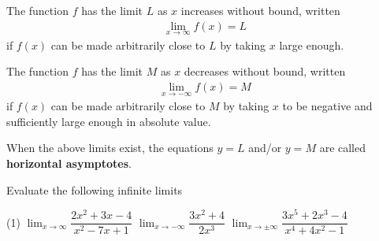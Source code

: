 \documentclass[../mathNotesPreamble]{subfiles}
\begin{document}
  \begin{thmBox*}
    The function $f$ has the limit $L$ as $x$ increases without bound, written
    \begin{align*}
      \lim_{x\to \infty} f(x)=L
    \end{align*}
    if $f(x)$ can be made arbitrarily close to $L$ by taking $x$ large enough.

    The function $f$ has the limit $M$ as $x$ decreases without bound, written
    \begin{align*}
      \lim_{x\to -\infty} f(x)=M
    \end{align*}
    if $f(x)$ can be made arbitrarily close to $M$ by taking $x$ to be negative and sufficiently large enough in absolute value.

    When the above limits exist, the equations $y=L$ and/or $y=M$ are called \textbf{horizontal asymptotes}.
  \end{thmBox*}
  \begin{ex*}
    Evaluate the following infinite limits
  \end{ex*}
  \begin{extasks}[after-item-skip=\stretch{1}](1)
    \task $\displaystyle \lim_{x\to \infty} \dfrac{2x^2+3x-4}{x^2-7x+1}$
    \task $\displaystyle \lim_{x\to -\infty} \dfrac{3x^2+4}{2x^3}$
    \task $\displaystyle \lim_{x\to \pm\infty} \dfrac{3x^5+2x^3-4}{x^4+4x^2-1}$
  \end{extasks}
  \pagebreak
\end{document}
